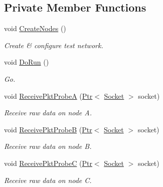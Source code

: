 \subsection*{Private Member Functions}
\begin{DoxyCompactItemize}
\item 
void \hyperlink{classns3_1_1olsr_1_1TcRegressionTest_a09709ecf415b2a4c90c78aadb4c84c49}{Create\+Nodes} ()
\begin{DoxyCompactList}\small\item\em Create \& configure test network. \end{DoxyCompactList}\item 
void \hyperlink{classns3_1_1olsr_1_1TcRegressionTest_ab3215c11b0586486c641af620fb1bc0b}{Do\+Run} ()
\begin{DoxyCompactList}\small\item\em Go. \end{DoxyCompactList}\item 
void \hyperlink{classns3_1_1olsr_1_1TcRegressionTest_ab21ef40dd3829ca85467f4eff91ab34a}{Receive\+Pkt\+ProbeA} (\hyperlink{classns3_1_1Ptr}{Ptr}$<$ \hyperlink{classns3_1_1Socket}{Socket} $>$ socket)
\begin{DoxyCompactList}\small\item\em Receive raw data on node A. \end{DoxyCompactList}\item 
void \hyperlink{classns3_1_1olsr_1_1TcRegressionTest_a4dbe3e9183778cf92394bd60a48a246b}{Receive\+Pkt\+ProbeB} (\hyperlink{classns3_1_1Ptr}{Ptr}$<$ \hyperlink{classns3_1_1Socket}{Socket} $>$ socket)
\begin{DoxyCompactList}\small\item\em Receive raw data on node B. \end{DoxyCompactList}\item 
void \hyperlink{classns3_1_1olsr_1_1TcRegressionTest_a7496cd5cc77803602588b9767c4bb081}{Receive\+Pkt\+ProbeC} (\hyperlink{classns3_1_1Ptr}{Ptr}$<$ \hyperlink{classns3_1_1Socket}{Socket} $>$ socket)
\begin{DoxyCompactList}\small\item\em Receive raw data on node C. \end{DoxyCompactList}\end{DoxyCompactItemize}
